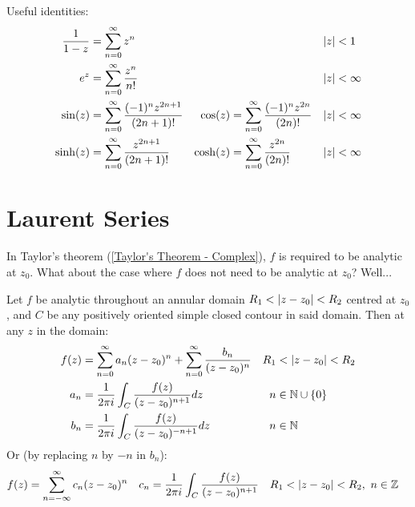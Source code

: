 \documentclass[12pt, english]{book}
\begin{document}
	Useful identities:
	\begin{align*}
		\frac{1}{1-z} &= \sum_{n=0}^{\infty} z^n  &&& \abs{z} &< 1 \\
		e^z &= \sum_{n=0}^{\infty} \frac{z^n}{n!} &&& \abs{z} &< \infty \\
		\sin(z) &=  \sum_{n=0}^{\infty} \frac{(-1)^n z^{2n+1}}{(2n+1)!} & 
		\cos(z) &=  \sum_{n=0}^{\infty} \frac{(-1)^n z^{2n}}{(2n)!} & \abs{z}&<\infty \\
		\sinh(z) &=  \sum_{n=0}^{\infty} \frac{z^{2n+1}}{(2n+1)!} & 
		\cosh(z) &=  \sum_{n=0}^{\infty} \frac{z^{2n}}{(2n)!} & \abs{z}&<\infty \\
 	\end{align*}
 
 	\section{Laurent Series} \label{Laurent Series Section - Complex}
	
	In Taylor's theorem (\cref{Taylor's Theorem - Complex}), \(f\) is required to be analytic at \(z_0\). What about the case where \(f\) does not need to be analytic at \(z_0\)? Well...
	
	\begin{theorem}
		\label{Laurent's Theorem - Complex}
		Let \(f\) be analytic throughout an annular domain \(R_1 < \abs{z-z_0}<R_2 \) centred at \(z_0\), and \(C\) be any positively oriented simple closed contour in said domain. Then at any \(z\) in the domain:
		\begin{align*}
			f(z) &= \sum_{n=0}^{\infty} a_n (z-z_0)^n + \sum_{n=0}^{\infty} \frac{b_n}{(z-z_0)^n} & R_1 &< \abs{z-z_0} < R_2 \\
			a_n &= \frac{1}{2\pi i} \int_{C} \frac{f(z)}{(z-z_0)^{n+1}} dz 
				& n &\in \mathbb{N}\cup\{0\} \\
			b_n &= \frac{1}{2\pi i } \int_{C} \frac{f(z)}{(z-z_0)^{-n+1}} dz
				& n &\in \mathbb{N}
		\end{align*}
		Or (by replacing \(n\) by \(-n\) in \(b_n\)):
		\begin{align*}
			f(z) &= \sum_{n=-\infty}^{\infty} c_n (z-z_0)^n & 
			c_n &= \frac{1}{2\pi i} \int_{C} \frac{f(z)}{(z-z_0)^{n+1}} &
			R_1 &< \abs{z-z_0} < R_2, \ n \in \mathbb{Z} 
		\end{align*}
	\end{theorem}
\end{document}
